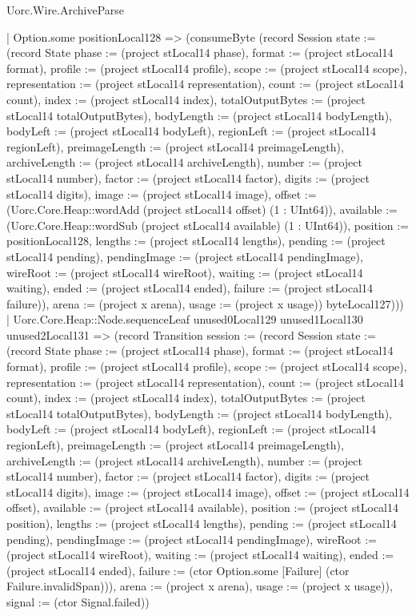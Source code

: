 \begin{lexlean}{Uorc.Wire.ArchiveParse}
\begin{semanticmodule}
{                | Option.some positionLocal128 => (consumeByte (record Session {state := (record State {phase := (project stLocal14 phase), format := (project stLocal14 format), profile := (project stLocal14 profile), scope := (project stLocal14 scope), representation := (project stLocal14 representation), count := (project stLocal14 count), index := (project stLocal14 index), totalOutputBytes := (project stLocal14 totalOutputBytes), bodyLength := (project stLocal14 bodyLength), bodyLeft := (project stLocal14 bodyLeft), regionLeft := (project stLocal14 regionLeft), preimageLength := (project stLocal14 preimageLength), archiveLength := (project stLocal14 archiveLength), number := (project stLocal14 number), factor := (project stLocal14 factor), digits := (project stLocal14 digits), image := (project stLocal14 image), offset := (Uorc.Core.Heap::wordAdd (project stLocal14 offset) (1 : UInt64)), available := (Uorc.Core.Heap::wordSub (project stLocal14 available) (1 : UInt64)), position := positionLocal128, lengths := (project stLocal14 lengths), pending := (project stLocal14 pending), pendingImage := (project stLocal14 pendingImage), wireRoot := (project stLocal14 wireRoot), waiting := (project stLocal14 waiting), ended := (project stLocal14 ended), failure := (project stLocal14 failure)}), arena := (project x arena), usage := (project x usage)}) byteLocal127)))
            | Uorc.Core.Heap::Node.sequenceLeaf unused0Local129 unused1Local130 unused2Local131 => (record Transition {session := (record Session {state := (record State {phase := (project stLocal14 phase), format := (project stLocal14 format), profile := (project stLocal14 profile), scope := (project stLocal14 scope), representation := (project stLocal14 representation), count := (project stLocal14 count), index := (project stLocal14 index), totalOutputBytes := (project stLocal14 totalOutputBytes), bodyLength := (project stLocal14 bodyLength), bodyLeft := (project stLocal14 bodyLeft), regionLeft := (project stLocal14 regionLeft), preimageLength := (project stLocal14 preimageLength), archiveLength := (project stLocal14 archiveLength), number := (project stLocal14 number), factor := (project stLocal14 factor), digits := (project stLocal14 digits), image := (project stLocal14 image), offset := (project stLocal14 offset), available := (project stLocal14 available), position := (project stLocal14 position), lengths := (project stLocal14 lengths), pending := (project stLocal14 pending), pendingImage := (project stLocal14 pendingImage), wireRoot := (project stLocal14 wireRoot), waiting := (project stLocal14 waiting), ended := (project stLocal14 ended), failure := (ctor Option.some [Failure] (ctor Failure.invalidSpan))}), arena := (project x arena), usage := (project x usage)}), signal := (ctor Signal.failed)})
}
\end{semanticmodule}
\end{lexlean}
